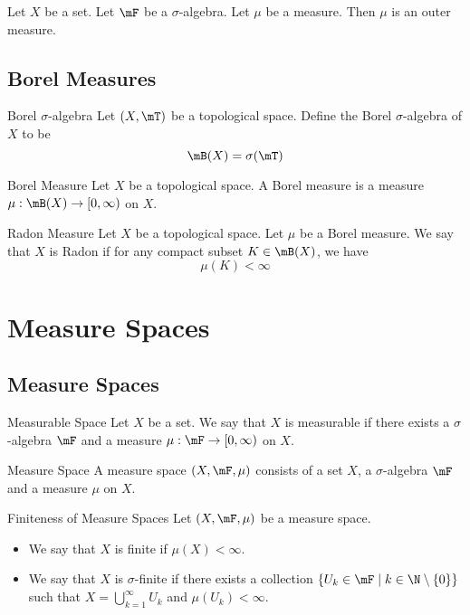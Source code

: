 \documentclass[a4paper]{article}
\begin{document}
\begin{lmm}{}{} Let $X$ be a set. Let $\mF$ be a $\sigma$-algebra. Let $\mu$ be a measure. Then $\mu$ is an outer measure. 
\end{lmm}

\subsection{Borel Measures}
\begin{defn}{Borel $\sigma$-algebra}{} Let $(X,\mT)$ be a topological space. Define the Borel $\sigma$-algebra of $X$ to be $$\mB(X)=\sigma(\mT)$$
\end{defn}

\begin{defn}{Borel Measure}{} Let $X$ be a topological space. A Borel measure is a measure $\mu:\mB(X)\to[0,\infty)$ on $X$. 
\end{defn}

\begin{defn}{Radon Measure}{} Let $X$ be a topological space. Let $\mu$ be a Borel measure. We say that $X$ is Radon if for any compact subset $K\in\mB(X)$, we have $$\mu(K)<\infty$$
\end{defn}

\pagebreak
\section{Measure Spaces}
\subsection{Measure Spaces}
\begin{defn}{Measurable Space}{} Let $X$ be a set. We say that $X$ is measurable if there exists a $\sigma$-algebra $\mF$ and a measure $\mu:\mF\to[0,\infty)$ on $X$. 
\end{defn}

\begin{defn}{Measure Space}{} A measure space $(X,\mF,\mu)$ consists of a set $X$, a $\sigma$-algebra $\mF$ and a measure $\mu$ on $X$. 
\end{defn}

\begin{defn}{Finiteness of Measure Spaces}{} Let $(X,\mF,\mu)$ be a measure space. 
\begin{itemize}
\item We say that $X$ is finite if $\mu(X)<\infty$. 
\item We say that $X$ is $\sigma$-finite if there exists a collection $\{U_k\in\mF\;|\;k\in\N\setminus\{0\}\}$ such that $X=\bigcup_{k=1}^\infty U_k$ and $\mu(U_k)<\infty$. 
\end{itemize}
\end{defn}
\end{document}
